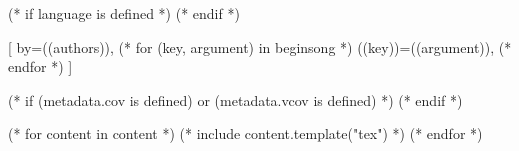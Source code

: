 
(* if language is defined *)
(* endif *)

[
  by={((authors))},
  (* for (key, argument) in beginsong *)
    ((key))={((argument))},
  (* endfor *)
  ]

  (* if (metadata.cov is defined) or (metadata.vcov is defined) *)
  \cover
  (* endif *)

  (* for content in content *)
        (* include content.template("tex") *)
  (* endfor *)

\endsong

